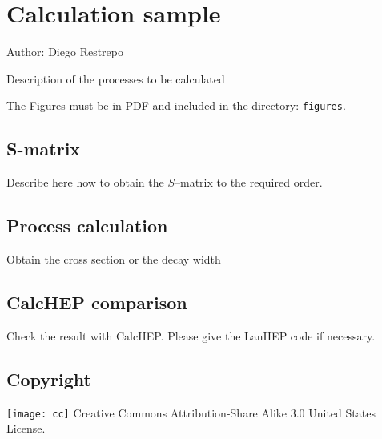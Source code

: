 
\chapter{Calculation sample}

Author: Diego Restrepo

Description of the processes to be calculated

The Figures must be in PDF and included in the directory: \verb|figures|.

\section{S-matrix}
Describe here how to obtain the $S$--matrix to the required order.

\section{Process calculation}
Obtain the cross section or the decay width

\section{CalcHEP comparison}
Check the result with CalcHEP. Please give the LanHEP code if necessary.


\section{Copyright}
\texttt{[image: cc]} Creative Commons Attribution-Share Alike 3.0 United States License.




